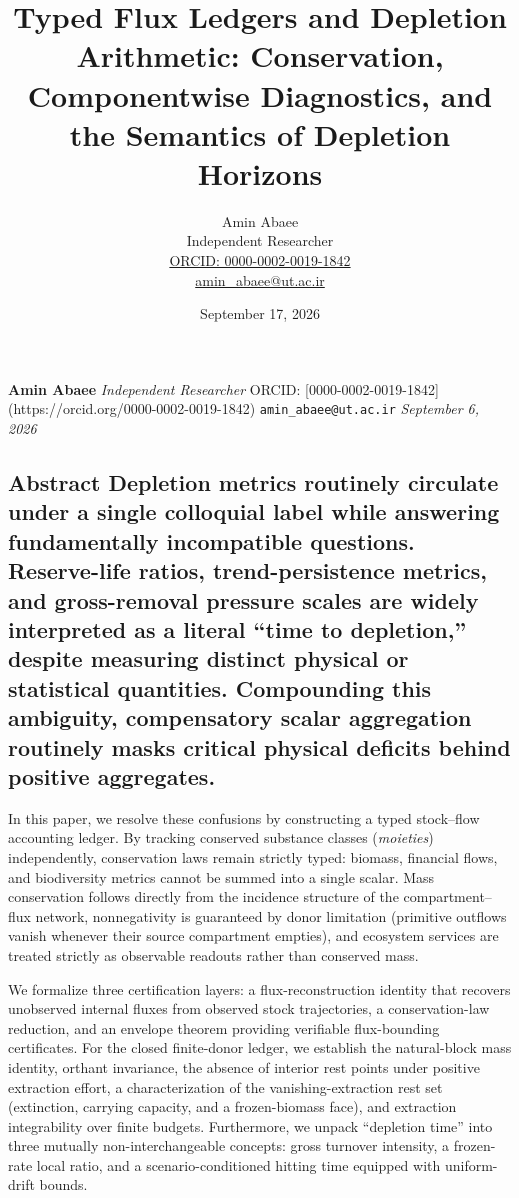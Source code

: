 \documentclass[11pt]{article}
\begin{document}
\title{Typed Flux Ledgers and Depletion Arithmetic: Conservation, Componentwise Diagnostics, and the Semantics of Depletion Horizons}
\author{Amin Abaee\\[0.35em]
{\small Independent Researcher}\\[0.55em]
{\small\href{https://orcid.org/\allowbreak{}0000-0002-0019-1842}{ORCID: 0000-0002-0019-1842}}\\[0.3em]
{\small\href{mailto:amin\_abaee@ut.ac.ir}{amin\_abaee@ut.ac.ir}}}
\date{September 17, 2026}
\maketitle

\textbf{Amin Abaee} \emph{Independent Researcher} ORCID: [0000-0002-0019-1842](https://orcid.org/0000-0002-0019-1842) \texttt{amin\_abaee@ut.ac.ir} \emph{September 6, 2026}

\vspace{0.8em}

\subsection*{Abstract Depletion metrics routinely circulate under a single colloquial label while answering fundamentally incompatible questions. Reserve-life ratios, trend-persistence metrics, and gross-removal pressure scales are widely interpreted as a literal ``time to depletion,'' despite measuring distinct physical or statistical quantities. Compounding this ambiguity, compensatory scalar aggregation routinely masks critical physical deficits behind positive aggregates.}\label{abstract-depletion-metrics-routinely-circulate-under-a-single-colloqui}

In this paper, we resolve these confusions by constructing a typed stock--flow accounting ledger. By tracking conserved substance classes (\emph{moieties}) independently, conservation laws remain strictly typed: biomass, financial flows, and biodiversity metrics cannot be summed into a single scalar. Mass conservation follows directly from the incidence structure of the compartment--flux network, nonnegativity is guaranteed by donor limitation (primitive outflows vanish whenever their source compartment empties), and ecosystem services are treated strictly as observable readouts rather than conserved mass.

We formalize three certification layers: a flux-reconstruction identity that recovers unobserved internal fluxes from observed stock trajectories, a conservation-law reduction, and an envelope theorem providing verifiable flux-bounding certificates. For the closed finite-donor ledger, we establish the natural-block mass identity, orthant invariance, the absence of interior rest points under positive extraction effort, a characterization of the vanishing-extraction rest set (extinction, carrying capacity, and a frozen-biomass face), and extraction integrability over finite budgets. Furthermore, we unpack ``depletion time'' into three mutually non-interchangeable concepts: gross turnover intensity, a frozen-rate local ratio, and a scenario-conditioned hitting time equipped with uniform-drift bounds.
\end{document}
